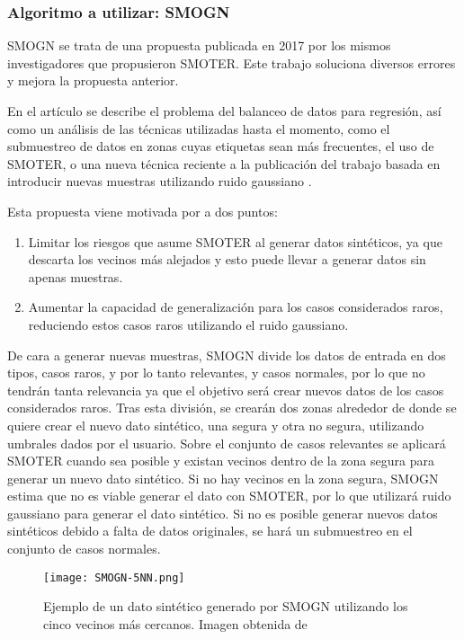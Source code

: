 \subsubsection{Algoritmo a utilizar: SMOGN}

SMOGN \cite{SMOGN} se trata de una propuesta publicada en 2017 por los mismos investigadores que propusieron SMOTER. Este trabajo soluciona diversos errores y mejora la propuesta anterior.

En el artículo se describe el problema del balanceo de datos para regresión, así como un análisis de las técnicas utilizadas hasta el momento, como el submuestreo de datos en zonas cuyas etiquetas sean más frecuentes, el uso de SMOTER, o una nueva técnica reciente a la publicación del trabajo basada en introducir nuevas muestras utilizando ruido gaussiano \cite{oversamplingGussianNoise}.

Esta propuesta viene motivada por a dos puntos:

\begin{enumerate}
	\item Limitar los riesgos que asume SMOTER al generar datos sintéticos, ya que descarta los vecinos más alejados y esto puede llevar a generar datos sin apenas muestras.
	\item Aumentar la capacidad de generalización para los casos considerados raros, reduciendo estos casos raros utilizando el ruido gaussiano.
\end{enumerate}

De cara a generar nuevas muestras, SMOGN divide los datos de entrada en dos tipos, casos raros, y por lo tanto relevantes, y casos normales, por lo que no tendrán tanta relevancia ya que el objetivo será crear nuevos datos de los casos considerados raros. Tras esta división, se crearán dos zonas alrededor de donde se quiere crear el nuevo dato sintético, una segura y otra no segura, utilizando umbrales dados por el usuario. Sobre el conjunto de casos relevantes se aplicará SMOTER cuando sea posible y existan vecinos dentro de la zona segura para generar un nuevo dato sintético. Si no hay vecinos en la zona segura, SMOGN estima que no es viable generar el dato con SMOTER, por lo que utilizará ruido gaussiano para generar el dato sintético. Si no es posible generar nuevos datos sintéticos debido a falta de datos originales, se hará un submuestreo en el conjunto de casos normales.


\begin{figure}[H]
    \centering
	  \texttt{[image: SMOGN-5NN.png]}
    \caption{Ejemplo de un dato sintético generado por SMOGN utilizando los cinco vecinos más cercanos. Imagen obtenida de \cite{SMOGN}}
	 \label{fig:SMOGN-5NN}
\end{figure}


